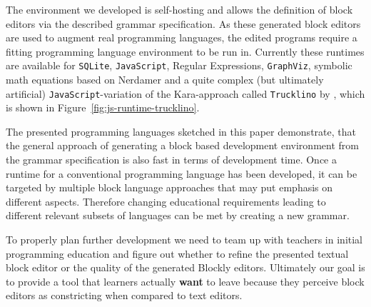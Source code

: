 \documentclass[sigconf,natbib=false]{acmart}
\begin{document}
The environment we developed is self-hosting and allows the definition of block editors via the described grammar specification. As these generated block editors are used to augment real programming languages, the edited programs require a fitting programming language environment to be run in. Currently these runtimes are available for \texttt{SQLite}, \texttt{Java\-Script}, Regular Expressions, \texttt{Graph\-Viz}, symbolic math equations based on Nerdamer and a quite complex (but ultimately artificial) \texttt{Java\-Script}-variation of the Kara-approach called \texttt{Trucklino} by \cite{popp_konzeption_2019}, which is shown in Figure~\ref{fig:js-runtime-trucklino}.

The presented programming languages sketched in this paper demonstrate, that the general approach of generating a block based development environment from the grammar specification is also fast in terms of development time. Once a runtime for a conventional programming language has been developed, it can be targeted by multiple block language approaches that may put emphasis on different aspects. Therefore changing educational requirements leading to different relevant subsets of languages can be met by creating a new grammar.

To properly plan further development  we need to team up with teachers in initial programming education and figure out whether to refine the presented textual block editor or the quality of the generated Blockly editors. Ultimately our goal is to provide a tool that learners actually \textbf{want} to leave because they perceive block editors as constricting when compared to text editors.


\end{document}
